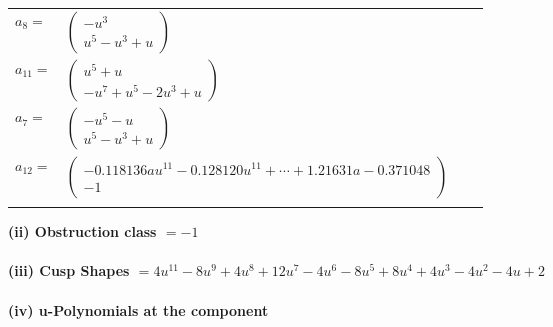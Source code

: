 \documentclass[1p]{elsarticle_modified}
\theoremstyle{definition}
\begin{document}
\begin{tabular}{m{7pt} m{180pt} m{7pt} m{180pt} }
\flushright $a_{8}=$&$\begin{pmatrix}- u^3\\u^5- u^3+u\end{pmatrix}$ \\
\flushright $a_{11}=$&$\begin{pmatrix}u^5+u\\- u^7+u^5-2 u^3+u\end{pmatrix}$ \\
\flushright $a_{7}=$&$\begin{pmatrix}- u^5- u\\u^5- u^3+u\end{pmatrix}$ \\
\flushright $a_{12}=$&$\begin{pmatrix}-0.118136 a u^{11}-0.128120 u^{11}+\cdots+1.21631 a-0.371048\\-1\end{pmatrix}$\\&\end{tabular}
\flushleft \textbf{(ii) Obstruction class $= -1$}\\~\\
\flushleft \textbf{(iii) Cusp Shapes $= 4 u^{11}-8 u^9+4 u^8+12 u^7-4 u^6-8 u^5+8 u^4+4 u^3-4 u^2-4 u+2$}\\~\\
\newpage\renewcommand{\arraystretch}{1}
\flushleft \textbf{(iv) u-Polynomials at the component}\newline \\
\end{document}
